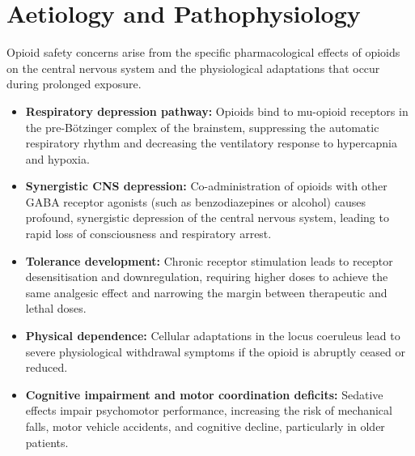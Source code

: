 \section*{Aetiology and Pathophysiology}
Opioid safety concerns arise from the specific pharmacological effects of opioids on the central nervous system and the physiological adaptations that occur during prolonged exposure.
\begin{itemize}
    \item \textbf{Respiratory depression pathway:} Opioids bind to mu-opioid receptors in the pre-B\"otzinger complex of the brainstem, suppressing the automatic respiratory rhythm and decreasing the ventilatory response to hypercapnia and hypoxia.
    \item \textbf{Synergistic CNS depression:} Co-administration of opioids with other GABA receptor agonists (such as benzodiazepines or alcohol) causes profound, synergistic depression of the central nervous system, leading to rapid loss of consciousness and respiratory arrest.
    \item \textbf{Tolerance development:} Chronic receptor stimulation leads to receptor desensitisation and downregulation, requiring higher doses to achieve the same analgesic effect and narrowing the margin between therapeutic and lethal doses.
    \item \textbf{Physical dependence:} Cellular adaptations in the locus coeruleus lead to severe physiological withdrawal symptoms if the opioid is abruptly ceased or reduced.
    \item \textbf{Cognitive impairment and motor coordination deficits:} Sedative effects impair psychomotor performance, increasing the risk of mechanical falls, motor vehicle accidents, and cognitive decline, particularly in older patients.
\end{itemize}

